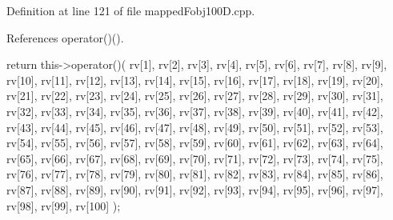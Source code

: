 \-Definition at line 121 of file mapped\-Fobj100\-D.\-cpp.



\-References operator()().


\begin{DoxyCode}
{
  return this->operator()(
  rv[1],
  rv[2],
  rv[3],
  rv[4],
  rv[5],
  rv[6],
  rv[7],
  rv[8],
  rv[9],
  rv[10],
  rv[11],
  rv[12],
  rv[13],
  rv[14],
  rv[15],
  rv[16],
  rv[17],
  rv[18],
  rv[19],
  rv[20],
  rv[21],
  rv[22],
  rv[23],
  rv[24],
  rv[25],
  rv[26],
  rv[27],
  rv[28],
  rv[29],
  rv[30],
  rv[31],
  rv[32],
  rv[33],
  rv[34],
  rv[35],
  rv[36],
  rv[37],
  rv[38],
  rv[39],
  rv[40],
  rv[41],
  rv[42],
  rv[43],
  rv[44],
  rv[45],
  rv[46],
  rv[47],
  rv[48],
  rv[49],
  rv[50],
  rv[51],
  rv[52],
  rv[53],
  rv[54],
  rv[55],
  rv[56],
  rv[57],
  rv[58],
  rv[59],
  rv[60],
  rv[61],
  rv[62],
  rv[63],
  rv[64],
  rv[65],
  rv[66],
  rv[67],
  rv[68],
  rv[69],
  rv[70],
  rv[71],
  rv[72],
  rv[73],
  rv[74],
  rv[75],
  rv[76],
  rv[77],
  rv[78],
  rv[79],
  rv[80],
  rv[81],
  rv[82],
  rv[83],
  rv[84],
  rv[85],
  rv[86],
  rv[87],
  rv[88],
  rv[89],
  rv[90],
  rv[91],
  rv[92],
  rv[93],
  rv[94],
  rv[95],
  rv[96],
  rv[97],
  rv[98],
  rv[99],
  rv[100]
  );
}
\end{DoxyCode}
